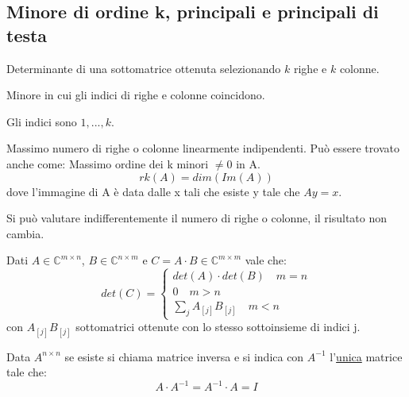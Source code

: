 \documentclass[12pt,a4paper,]{report}
\begin{document}
    \subsection{Minore di ordine k, principali e principali di testa}
\begin{definizione}
    Determinante di una sottomatrice ottenuta selezionando $k$ righe e $k$ colonne.
\end{definizione}
\begin{definizione}
    Minore in cui gli indici di righe e colonne coincidono.
\end{definizione}
\begin{definizione}
    Gli indici sono $1,...,k$.
\end{definizione}
\begin{definizione}
    [Rango]
    Massimo numero di righe o colonne linearmente indipendenti.
    Può essere trovato anche come:
    Massimo ordine dei k minori $\neq 0$ in A.
    \[
    rk(A) = dim(Im(A))
    \]
    dove l'immagine di A è data dalle x tali che esiste y tale che $Ay=x$.
\end{definizione}
\begin{nota}
    Si può valutare indifferentemente il numero di righe o colonne, il risultato non cambia.
\end{nota}
\begin{teorema}
    \label{th: Binet-Cauchy}
    Dati $A\in \mathbb{C}^{m\times n}$, $B\in \mathbb{C}^{n\times m}$ e $C=A\cdot B \in \mathbb{C}^{m\times m}$ vale che:
    \[
    det(C) = 
    \begin{cases}
        det(A)\cdot det(B) \quad m=n \\
        0 \quad m>n \\
        \sum_jA_{[j]}B_{[j]} \quad m<n
    \end{cases}
    \]
    con $A_{[j]}B_{[j]}$ sottomatrici ottenute con lo stesso sottoinsieme di indici j.
\end{teorema}
\begin{definizione}
    Data $A^{n\times n}$ se esiste si chiama matrice inversa e si indica con $A^{-1}$ l'\uline{unica} matrice tale che:
    \[
    A\cdot A^{-1} = A^{-1} \cdot A = I
    \]
\end{definizione}
\end{document}
